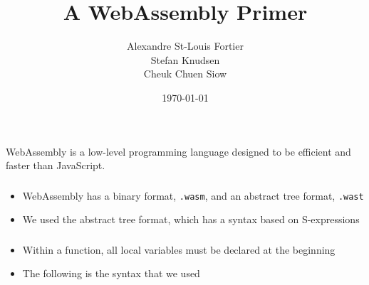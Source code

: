 \documentclass{beamer}
\title[WebAssembly Primer]{A WebAssembly Primer}
\author{
Alexandre St-Louis Fortier \\
Stefan Knudsen \\
Cheuk Chuen Siow }
\institute[McGill] {COMP 520 - Group 14}
\date{\today}
\begin{document}
\lstset{language=ML}

\begin{frame}
\titlepage %
\end{frame}



\begin{frame}
\frametitle{}
\begin{block}{}
  WebAssembly is a low-level programming language designed to be efficient and faster than JavaScript.
\end{block}

\end{frame}


\begin{frame}
\frametitle{}
\begin{itemize}
\item WebAssembly has a binary format, \texttt{.wasm}, and an abstract tree format, \texttt{.wast}
\item We used the abstract tree format, which has a syntax based on S-expressions
\end{itemize}
\end{frame}


\begin{frame}
\frametitle{}

\begin{itemize}
  \item Within a function, all local variables must be declared at the beginning
  \item The following is the syntax that we used
\end{itemize}
\end{frame}
\end{document}
